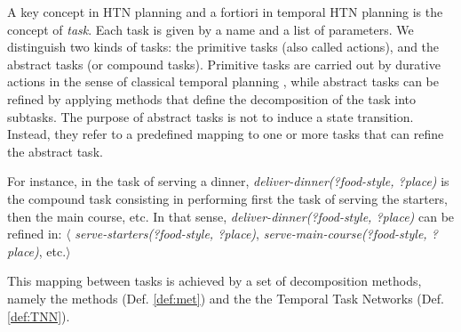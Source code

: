 \documentclass[letterpaper]{article} %
\begin{document}


 A key concept in HTN planning and a fortiori in temporal HTN planning is the concept of {\it task}. Each task is given by a name and a list of parameters. We distinguish two kinds of tasks: the  primitive tasks (also called actions), and the abstract tasks (or compound tasks).
 Primitive tasks are carried out by  durative actions in the sense of classical temporal planning \cite{fox03}, while abstract tasks can be refined by applying methods that define the decomposition of the task into subtasks. The purpose of abstract tasks is not to induce a state transition. Instead, they refer to a predefined mapping to one or more tasks that can refine the abstract task.
 
 For instance, in the task of serving a dinner, {\it deliver-dinner(?food-style, ?place)} is the compound task consisting in performing first the task of serving the starters, then the main course, etc. In that sense,  {\it deliver-dinner(?food-style, ?place)} can be refined in: $\langle$ {\it serve-starters(?food-style, ?place)},  {\it serve-main-course(?food-style, ?place)}, etc.$\rangle$

 This mapping between tasks is achieved by a set of decomposition methods, namely the methods (Def. \ref{def:met}) and the the Temporal Task Networks (Def. \ref{def:TNN}).%

 
\end{document}
